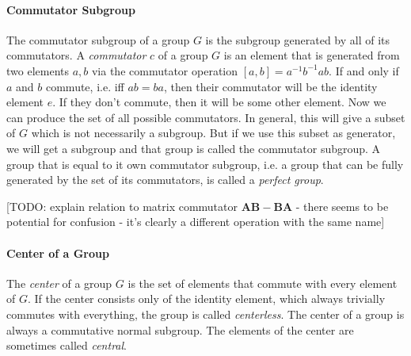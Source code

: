 


\paragraph{Commutator Subgroup} The commutator subgroup of a group $G$ is the subgroup generated by all of its commutators. A \emph{commutator} $c$ of a group $G$ is an element that is generated from two elements $a,b$ via the commutator operation $[a,b] = a^{-1} b^{-1} a b$. If and only if $a$ and $b$ commute, i.e. iff $ab = ba$, then their commutator will be the identity element $e$. If they don't commute, then it will be some other element. Now we can produce the set of all possible commutators. In general, this will give a subset of $G$ which is not necessarily a subgroup. But if we use this subset as generator, we will get a subgroup and that group is called the commutator subgroup. A group that is equal to it own commutator subgroup, i.e. a group that can be fully generated by the set of its commutators, is called a \emph{perfect group}.


[TODO: explain relation to matrix commutator $\mathbf{AB - BA}$ - there seems to be potential for confusion - it's clearly a different operation with the same name]




\paragraph{Center of a Group}
The \emph{center} of a group $G$ is the set of elements that commute with every element of $G$. If the center consists only of the identity element, which always trivially commutes with everything, the group is called \emph{centerless}. The center of a group is always a commutative normal subgroup. The elements of the center are sometimes called \emph{central}.

